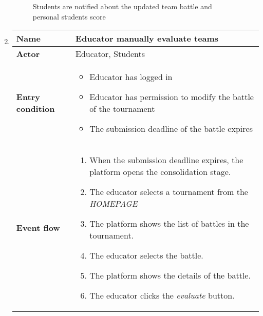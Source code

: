 \begin{enumerate}[label=\textbf{UC\arabic*}:,leftmargin=1.3cm]
            \begin{figure}[H]
                  \centering
                  \caption{Students are notified about the updated team battle and personal students score}
                  \label{fig:Students are notified about the updated team battle and personal students score}
            \end{figure}
            \pagebreak
      \item \textbf{}
            \begin{table}[H]
                  \centering
                  \begin{tabular}{|l|p{11.9cm}|}
                        \hline
                        \textbf{Name}            & Educator manually evaluate teams                                        \\\hline
                        \textbf{Actor}           & Educator, Students                                                          \\\hline
                        \textbf{Entry condition} &
                        \begin{itemize}
                              \item Educator has logged in
                              \item Educator has permission to modify the battle of the tournament
                              \item The submission deadline of the battle expires
                        \end{itemize}                                                      \\\hline
                        \textbf{Event flow}      &
                        \begin{enumerate}[label=\arabic*.]
                              \item When the submission deadline expires, the platform opens the consolidation stage.
                              \item The educator selects a tournament from the \emph{HOMEPAGE}
                              \item The platform shows the list of battles in the tournament.
                              \item The educator selects the battle.
                              \item The platform shows the details of the battle.
                              \item The educator clicks the \emph{evaluate} button.

\end{enumerate}
\end{tabular}
\end{table}
\end{enumerate}
